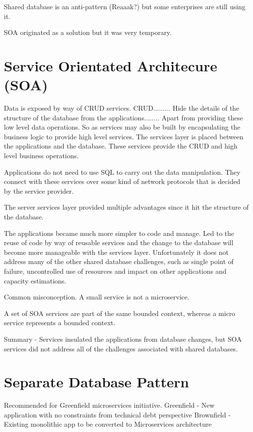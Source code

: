 \documentclass[a4paper, 11pt]{book}
\begin{document}
    Shared database is an anti-pattern (Reaaak?) but some enterprises are still using it.

    SOA originated as a solution but it was very temporary.


    \section{Service Orientated Architecure (SOA)}
    Data is exposed by way of CRUD services.
    CRUD.........
    Hide the details of the structure of the database from the applications........
    Apart from providing these low level data operations.
    So as services may also be built by encapsulating the business logic to provide high level services.
    The services layer is placed between the applications and the database.
    These services provide the CRUD and high level business operations.

    Applications do not need to use SQL to carry out the data manipulation.
    They connect with these services over some kind of network protocols that is decided by the service provider.

    The server services layer provided multiple advantages since it hit the structure of the database.

    The applications became much more simpler to code and manage.
    Led to the reuse of code by way of reusable services and the change to the database will become more manageable with the services layer.
    Unfortunately it does not address many of the other shared database challenges, such as single point of failure, uncontrolled use of resources and impact on other applications and capacity estimations.

    Common misconception.
    A small service is not a microservice.

    A set of SOA services are part of the same bounded context, whereas a micro service represents a bounded context.

    Summary
    - Services insulated the applications from database changes, but SOA services did not address all of the challenges associated with shared databases.


    \section{Separate Database Pattern}
    Recommended for Greenfield microservices initiative.
    Greenfield - New application with no constraints from technical debt perspective
    Brownfield - Existing monolithic app to be converted to Microservices architecture
\end{document}
